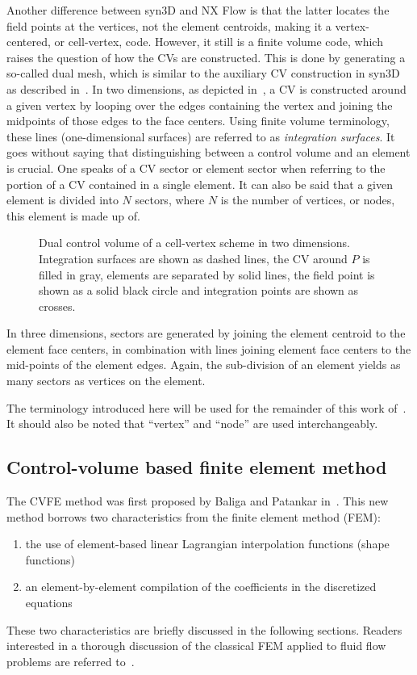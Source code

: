 Another difference between syn3D and NX Flow is that the latter locates the field points at the vertices, not the element centroids, making it a vertex-centered, or cell-vertex, code. However, it still is a finite volume code, which raises the question of how the CVs are constructed. This is done by generating a so-called dual mesh, which is similar to the auxiliary CV construction in syn3D as described in~. In two dimensions, as depicted in~, a CV is constructed around a given vertex by looping over the edges containing the vertex and joining the midpoints of those edges to the face centers. Using finite volume terminology, these lines (one-dimensional surfaces) are referred to as \textit{integration surfaces}. It goes without saying that distinguishing between a control volume and an element is crucial. One speaks of a CV sector or element sector when referring to the portion of a CV contained in a single element. It can also be said that a given element is divided into $N$ sectors, where $N$ is the number of vertices, or nodes, this element is made up of. 
\begin{figure}
    \centering
    \begin{tikzpicture}[scale=3.5]
        
    \end{tikzpicture}
    \caption{Dual control volume of a cell-vertex scheme in two dimensions. Integration surfaces are shown as dashed lines, the CV around $P$ is filled in gray, elements are separated by solid lines, the field point is shown as a solid black circle and integration points are shown as crosses.}
    \label{fig:dualmeshtwo}
\end{figure}

In three dimensions, sectors are generated by joining the element centroid to the element face centers, in combination with lines joining element face centers to the mid-points of the element edges. Again, the sub-division of an element yields as many sectors as vertices on the element.

The terminology introduced here will be used for the remainder of this work of~. It should also be noted that ``vertex'' and ``node'' are used interchangeably.

\subsection{Control-volume based finite element method}
\label{sec:cvfem}
%
The CVFE method was first proposed by Baliga and Patankar in~\cite{baliga1980new,baliga1983control}. This new method borrows two characteristics from the finite element method (FEM):
\begin{enumerate}
    \item the use of element-based linear Lagrangian interpolation functions (shape functions)
    \item an element-by-element compilation of the coefficients in the discretized equations
\end{enumerate}
These two characteristics are briefly discussed in the following sections. Readers interested in a thorough discussion of the classical FEM applied to fluid flow problems are referred to~\cite{reddy2000finite}.


